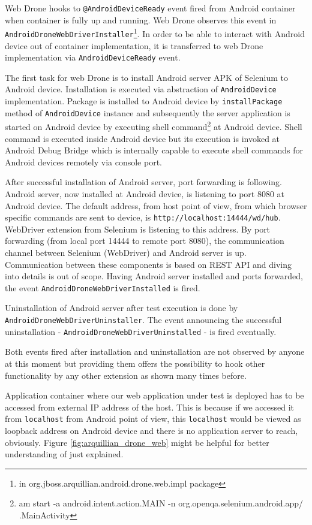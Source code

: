 \documentclass[12pt,final,oneside]{fithesis}
\begin{document}
Web Drone hooks to \texttt{@AndroidDeviceReady} event fired from Android container when container is fully up and running. Web Drone observes this event in \texttt{AndroidDroneWebDriverInstaller}\footnote{in org.jboss.arquillian.android.drone.web.impl package}. In order to be able to interact with Android device out of container implementation, it is transferred to web Drone implementation via \texttt{AndroidDeviceReady} event.

The first task for web Drone is to install Android server APK of Selenium to Android device. Installation is executed via abstraction of \texttt{AndroidDevice} implementation. Package is installed to Android device by \texttt{installPackage} method of \texttt{AndroidDevice} instance and subsequently the server application is started on Android device by executing shell command\footnote{am start -a android.intent.action.MAIN -n org.openqa.selenium.android.app/ .MainActivity} at Android device. Shell command is executed inside Android device but its execution is invoked at Android Debug Bridge which is internally capable to execute shell commands for Android devices remotely via console port.

After successful installation of Android server, port forwarding is following. Android server, now installed at Android device, is listening to port 8080 at Android device. The default address, from host point of view, from which browser specific commands are sent to device, is \texttt{http://localhost:14444/wd/hub}. WebDriver extension from Selenium is listening to this address. By port forwarding (from local port 14444 to remote port 8080), the communication channel between Selenium (WebDriver) and Android server is up. Communication between these components is based on REST API and diving into details is out of scope. Having Android server installed and ports forwarded, the event \texttt{AndroidDroneWebDriverInstalled} is fired.

Uninstallation of Android server after test execution is done by \texttt{AndroidDroneWebDriverUninstaller}. The event announcing the successful uninstallation - \texttt{AndroidDroneWebDriverUninstalled} - is fired eventually.

Both events fired after installation and uninstallation are not observed by anyone at this moment but providing them offers the possibility to hook other functionality by any other extension as shown many times before.

Application container where our web application under test is deployed has to be accessed from external IP address of the host. This is because if we accessed it from \texttt{localhost} from Android point of view, this \texttt{localhost} would be viewed as loopback address on Android device and there is no application server to reach, obviously. Figure \ref{fig:arquillian_drone_web} might be helpful for better understanding of just explained.
\end{document}
